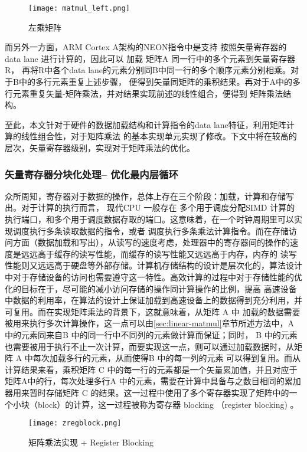 \begin{figure}
\centering
  \texttt{[image: matmul\_left.png]}
\caption{左乘矩阵}
\label{fig:matmul_left}
\end{figure}

而另外一方面，ARM Cortex A架构的NEON指令中是支持 按照矢量寄存器的 data lane 进行计算的，因此可以
加载 矩阵A 同一行中的多个元素到矢量寄存器 R，
再将R中各个data lane的元素分别同B中同一行的多个顺序元素分别相乘。对于B中的多行元素重复上述步骤，
便得到矢量同矩阵的乘积结果。再对于A中的多行元素重复矢量-矩阵乘法，并对结果实现前述的线性组合，便得到
矩阵乘法结构。

至此，本文针对于硬件的数据加载结构和计算指令的data lane特征，利用矩阵计算的线性组合性，对于矩阵乘法
的基本实现单元实现了修改。下文中将在较高的层次，矢量寄存器级别，实现对于矩阵乘法的优化。

\subsubsection{矢量寄存器分块化处理-- 优化最内层循环}
\label{sec:register-block}

众所周知，寄存器对于数据的操作，总体上存在三个阶段：加载，计算和存储写出。对于计算的执行而言， 
现代CPU 一般存在
多个用于调度分配SIMD 计算的执行端口，和多个用于调度数据存取的端口。这意味着，在一个时钟周期里可以实现调度执行多条读取数据的指令，或者
调度执行多条乘法计算指令。而在存储访问方面（数据加载和写出），从读写的速度考虑，处理器中的寄存器间的操作的速度是远远高于缓存的读写性能，而缓存的读写性能又远远高于内存，内存的
读写性能则又远远高于硬盘等外部存储。计算机存储结构的设计是层次化的，算法设计中对于存储设备的访问也需要遵守这一特性。高效计算的过程中对于存储性能的优化的目标在于，尽可能的减小访问存储的操作同计算操作的比例，提高
高速设备中数据的利用率，在算法的设计上保证加载到高速设备上的数据得到充分利用，并可复用。而在实现矩阵乘法的背景下，这就意味着，从矩阵 A 中
加载的数据需要被用来执行多次计算操作，这一点可以由\ref{sec:linear-matmul}章节所述方法中，A 中的元素同来自B 中的同一行中不同列的元素做计算而保证；同时，
B 中的元素也需要被用于执行不止一次计算，而要实现这一点，则可以通过加载数据时，从矩阵 A 中每次加载多行的元素，从而使得B 中的每一列的元素
可以得到复用。而从计算结果来看，乘积矩阵 C 中的每一行的元素都是一个矢量累加值，并且对应于矩阵A中的行，每次处理多行A 中的元素，需要在计算中具备与之数目相同的累加器用来暂时存储矩阵 C 的结果。这一过程中使用了多个寄存器实现了矩阵中的一个小块（block）的计算，这一过程被称为寄存器 blocking （register blocking) 。

\begin{figure}
\centering
\texttt{[image: zregblock.png]}
\caption{矩阵乘法实现 + Register Blocking}
\label{fig:zregblock}
\end{figure}

